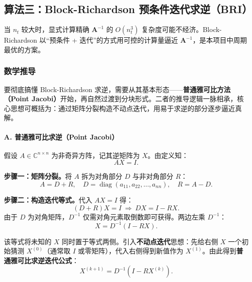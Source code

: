     \subsection{算法三：Block-Richardson 预条件迭代求逆（BRI）}
    \label{sec:bri}

    当 $n_{t}$ 较大时，显式计算精确 $\bm{A}^{-1}$ 的 $O(n_{t}^{3})$
    复杂度可能不经济。Block-Richardson 以“预条件 + 迭代”的方式用可控的计算量逼近
    $\bm{A}^{-1}$，是本项目中周期最优的方案。

    \subsubsection{数学推导}

    要彻底搞懂 Block-Richardson 求逆，需要从其基本形态——\textbf{普通雅可比方法（Point
    Jacobi）}开始，再自然过渡到分块形式。二者的推导逻辑一脉相承，核心思想可概括为：通过矩阵分裂构造不动点迭代，用易于求逆的部分逐步逼近真解。

    \paragraph{A. 普通雅可比求逆（Point Jacobi）}

    假设 $A \in \mathbb{C}^{n \times n}$ 为非奇异方阵，记其逆矩阵为 $X$。由定义知：
    \begin{equation}
        AX = I.
    \end{equation}

    \textbf{步骤一：矩阵分裂。}将 $A$ 拆为对角部分 $D$ 与非对角部分 $R$：
    \begin{equation}
        A = D + R,\quad D = \operatorname{diag}(a_{11}, a_{22}, \dots, a_{nn}),\quad
        R = A - D.
    \end{equation}

    \textbf{步骤二：构造迭代等式。}代入 $AX = I$ 得：
    \begin{equation}
        (D + R)X = I \ \Longrightarrow\ DX = I - RX.
    \end{equation}
    由于 $D$ 为对角矩阵，$D^{-1}$ 仅需对角元素取倒数即可获得。两边左乘 $D^{-1}$：
    \begin{equation}
        X = D^{-1}(I - RX).
    \end{equation}

    该等式将未知的 $X$ 同时置于等式两侧。引入\textbf{不动点迭代}思想：先给右侧 $X$
    一个初始猜测 $X^{(0)}$（通常取 $I$ 或零矩阵），代入右侧得到新值作为
    $X^{(1)}$。由此得到\textbf{普通雅可比求逆迭代公式}：
    \begin{equation}
        \boxed{X^{(k+1)} = D^{-1}(I - RX^{(k)})}.
    \end{equation}

